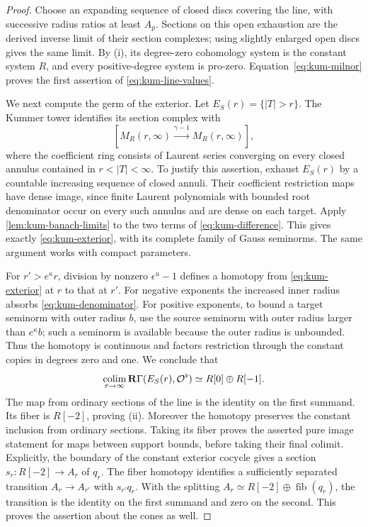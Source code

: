 \begin{proof}
Choose an expanding sequence of closed discs covering the line,
with successive radius ratios at least $A_p$.  Sections on this
open exhaustion are the derived inverse limit of their section
complexes; using slightly enlarged open discs gives the same
limit.  By (i), its degree-zero cohomology system is the constant
system $R$, and every positive-degree system is pro-zero.
Equation~\eqref{eq:kum-milnor} proves the first assertion of
\cref{eq:kum-line-values}.

We next compute the germ of the exterior.  Let
$E_S(r)=\{|T|>r\}$.  The Kummer tower identifies its section
complex with
\begin{equation}\label{eq:kum-exterior}
 \left[M_R(r,\infty)\xrightarrow{\gamma-1}
 M_R(r,\infty)\right],
\end{equation}
where the coefficient ring consists of Laurent series converging
on every closed annulus contained in $r<|T|<\infty$.
To justify this assertion, exhaust $E_S(r)$ by a countable
increasing sequence of closed annuli.  Their coefficient
restriction maps have dense image, since finite Laurent
polynomials with bounded root denominator occur on every such
annulus and are dense on each target.  Apply
\cref{lem:kum-banach-limits} to the two terms of
\cref{eq:kum-difference}.  This gives exactly
\cref{eq:kum-exterior}, with its complete family of Gauss
seminorms.  The same argument works with compact parameters.

For $r'>e^\kappa r$, division by nonzero
$\epsilon^u-1$ defines a homotopy from
\cref{eq:kum-exterior} at $r$ to that at $r'$.
For negative exponents the increased inner radius absorbs
\cref{eq:kum-denominator}.  For positive exponents, to bound a
target seminorm with outer radius $b$, use the source seminorm
with outer radius larger than $e^\kappa b$; such a seminorm is
available because the outer radius is unbounded.  Thus the
homotopy is continuous and factors restriction through the
constant copies in degrees zero and one.  We conclude that
\begin{equation}\label{eq:kum-exterior-germ}
 \operatorname*{colim}_{r\to\infty}\mathbf R\Gamma(E_S(r),\mathcal O^\flat)
 \simeq R[0]\oplus R[-1].
\end{equation}
The map from ordinary sections of the line is the identity on
the first summand.  Its fiber is $R[-2]$, proving (ii).
Moreover the homotopy preserves the constant inclusion from
ordinary sections.  Taking its fiber proves the asserted pure
image statement for maps between support bounds, before taking
their final colimit.  Explicitly, the boundary of the constant
exterior cocycle gives a section $s_r:R[-2]\to A_r$ of $q_r$.
The fiber homotopy identifies a sufficiently separated transition
$A_r\to A_{r'}$ with $s_{r'}q_r$.  With the splitting
$A_r\simeq R[-2]\oplus\operatorname{fib}(q_r)$, the transition
is the identity on the first summand and zero on the second.
This proves the assertion about the cones as well.


\end{proof}
